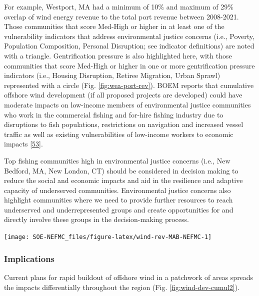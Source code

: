 \documentclass[
  10pt,
]{article}
\let\origfigure\figure
\let\endorigfigure\endfigure
\renewenvironment{figure}[1][2] {
    \expandafter\origfigure\expandafter[H]
} {
    \endorigfigure
}
\begin{document}
For example, Westport, MA had a minimum of 10\% and maximum of 29\% overlap of wind energy revenue to the total port revenue between 2008-2021. Those communities that score Med-High or higher in at least one of the vulnerability indicators that address environmental justice concerns (i.e., Poverty, Population Composition, Personal Disruption; see indicator definitions) are noted with a triangle. Gentrification pressure is also highlighted here, with those communities that score Med-High or higher in one or more gentrification pressure indicators (i.e., Housing Disruption, Retiree Migration, Urban Sprawl) represented with a circle (Fig. \ref{fig:wea-port-rev}). BOEM reports that cumulative offshore wind development (if all proposed projects are developed) could have moderate impacts on low-income members of environmental justice communities who work in the commercial fishing and for-hire fishing industry due to disruptions to fish populations, restrictions on navigation and increased vessel traffic as well as existing vulnerabilities of low-income workers to economic impacts {[}\protect\hyperlink{ref-boem_vineyard_2020}{53}{]}.

Top fishing communities high in environmental justice concerns (i.e., New Bedford, MA, New London, CT) should be considered in decision making to reduce the social and economic impacts and aid in the resilience and adaptive capacity of underserved communities. Environmental justice concerns also highlight communities where we need to provide further resources to reach underserved and underrepresented groups and create opportunities for and directly involve these groups in the decision-making process.

\begin{figure}

\texttt{[image: SOE-NEFMC\_files/figure-latex/wind-rev-MAB-NEFMC-1]} \hfill{}

\caption{Percent of Mid-Atlantic port revenue with majority NEFMC landings from Wind Energy Areas (WEA) in descending order from most to least port fisheries revenue from WEA. EJ = Environmental Justice.}\label{fig:wind-rev-MAB-NEFMC}
\end{figure}

\hypertarget{implications-7}{%
\subsubsection{Implications}\label{implications-7}}

Current plans for rapid buildout of offshore wind in a patchwork of areas spreads the impacts differentially throughout the region (Fig. \ref{fig:wind-dev-cumul2}).
\end{document}

